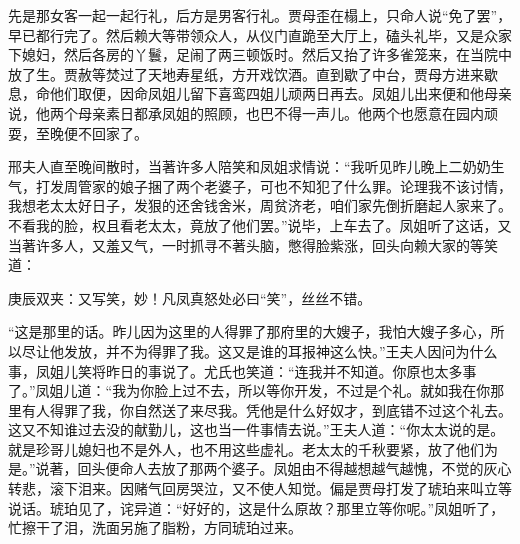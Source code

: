 \begin{parag}
    先是那女客一起一起行礼，后方是男客行礼。贾母歪在榻上，只命人说“免了罢”，早已都行完了。然后赖大等带领众人，从仪门直跪至大厅上，磕头礼毕，又是众家下媳妇，然后各房的丫鬟，足闹了两三顿饭时。然后又抬了许多雀笼来，在当院中放了生。贾赦等焚过了天地寿星纸，方开戏饮酒。直到歇了中台，贾母方进来歇息，命他们取便，因命凤姐儿留下喜鸾四姐儿顽两日再去。凤姐儿出来便和他母亲说，他两个母亲素日都承凤姐的照顾，也巴不得一声儿。他两个也愿意在园内顽耍，至晚便不回家了。
\end{parag}


\begin{parag}
    邢夫人直至晚间散时，当著许多人陪笑和凤姐求情说：“我听见昨儿晚上二奶奶生气，打发周管家的娘子捆了两个老婆子，可也不知犯了什么罪。论理我不该讨情，我想老太太好日子，发狠的还舍钱舍米，周贫济老，咱们家先倒折磨起人家来了。不看我的脸，权且看老太太，竟放了他们罢。”说毕，上车去了。凤姐听了这话，又当著许多人，又羞又气，一时抓寻不著头脑，憋得脸紫涨，回头向赖大家的等笑道：\begin{note}庚辰双夹：又写笑，妙！凡凤真怒处必曰“笑”，丝丝不错。\end{note}“这是那里的话。昨儿因为这里的人得罪了那府里的大嫂子，我怕大嫂子多心，所以尽让他发放，并不为得罪了我。这又是谁的耳报神这么快。”王夫人因问为什么事，凤姐儿笑将昨日的事说了。尤氏也笑道：“连我并不知道。你原也太多事了。”凤姐儿道：“我为你脸上过不去，所以等你开发，不过是个礼。就如我在你那里有人得罪了我，你自然送了来尽我。凭他是什么好奴才，到底错不过这个礼去。这又不知谁过去没的献勤儿，这也当一件事情去说。”王夫人道：“你太太说的是。就是珍哥儿媳妇也不是外人，也不用这些虚礼。老太太的千秋要紧，放了他们为是。”说著，回头便命人去放了那两个婆子。凤姐由不得越想越气越愧，不觉的灰心转悲，滚下泪来。因赌气回房哭泣，又不使人知觉。偏是贾母打发了琥珀来叫立等说话。琥珀见了，诧异道：“好好的，这是什么原故？那里立等你呢。”凤姐听了，忙擦干了泪，洗面另施了脂粉，方同琥珀过来。
\end{parag}


